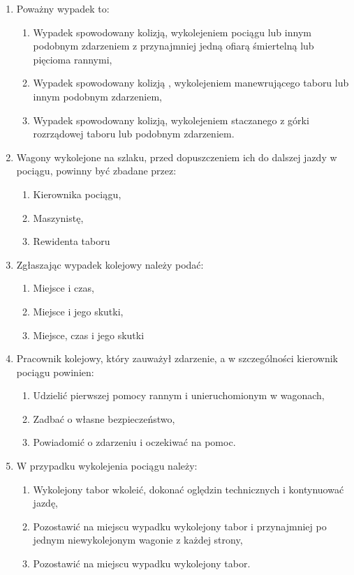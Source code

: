 \begin{tcolorbox}
	\begin{enumerate}
		\item Poważny wypadek to:
		\begin{enumerate}
			\item Wypadek spowodowany kolizją, wykolejeniem pociągu lub innym podobnym zdarzeniem z przynajmniej jedną ofiarą śmiertelną lub pięcioma rannymi,
			\item Wypadek spowodowany kolizją , wykolejeniem manewrującego taboru lub innym podobnym zdarzeniem,
			\item Wypadek spowodowany kolizją, wykolejeniem staczanego z górki rozrządowej taboru lub podobnym zdarzeniem.
		\end{enumerate}
		\item Wagony wykolejone na szlaku, przed dopuszczeniem ich do dalszej jazdy w pociągu, powinny być zbadane przez:
		\begin{enumerate}
			\item Kierownika pociągu,
			\item Maszynistę,
			\item Rewidenta taboru
		\end{enumerate}
		\item Zgłaszając wypadek kolejowy należy podać:
		\begin{enumerate}
			\item Miejsce i czas,
			\item Miejsce i jego skutki,
			\item Miejsce, czas i jego skutki
		\end{enumerate}
		\item Pracownik kolejowy, który zauważył zdarzenie, a w szczególności kierownik pociągu powinien:
		\begin{enumerate}
			\item Udzielić pierwszej pomocy rannym i unieruchomionym w wagonach,
			\item Zadbać o własne bezpieczeństwo,
			\item Powiadomić o zdarzeniu i oczekiwać na pomoc.
		\end{enumerate}
		\item W przypadku wykolejenia pociągu należy:
		\begin{enumerate}
			\item Wykolejony tabor wkoleić, dokonać oględzin technicznych i kontynuować jazdę,
			\item Pozostawić na miejscu wypadku wykolejony tabor i przynajmniej po jednym niewykolejonym wagonie z każdej strony,
			\item Pozostawić na miejscu wypadku wykolejony tabor.
		\end{enumerate}
	\end{enumerate}
	
\end{tcolorbox}

